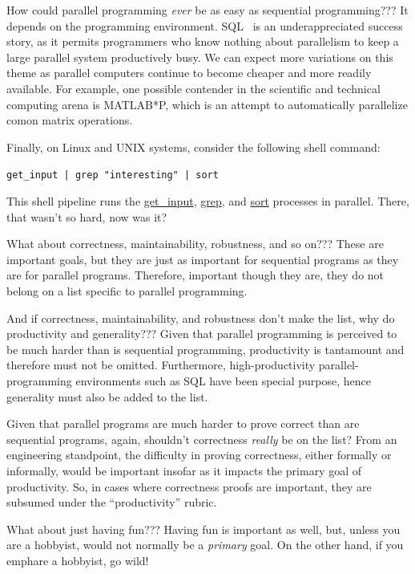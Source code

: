\QuickQ{}
	How could parallel programming \emph{ever} be as easy
	as sequential programming???
\QuickA{}
	It depends on the programming environment.
	SQL~\cite{DIS9075SQL92} is an underappreciated success
	story, as it permits programmers who know nothing about parallelism
	to keep a large parallel system productively busy.
	We can expect more variations on this theme as parallel
	computers continue to become cheaper and more readily available.
	For example, one possible contender in the scientific and
	technical computing arena is MATLAB*P,
	which is an attempt to automatically parallelize comon
	matrix operations.

	Finally, on Linux and UNIX systems, consider the following
	shell command:

	{\tt get\_input | grep "interesting" | sort}

	This shell pipeline runs the \url{get_input}, \url{grep},
	and \url{sort} processes in parallel.
	There, that wasn't so hard, now was it?

\QuickQ{}
	What about correctness, maintainability, robustness, and so on???
\QuickA{}
	These are important goals, but they are just as important for
	sequential programs as they are for parallel programs.
	Therefore, important though they are, they do not belong on
	a list specific to parallel programming.

\QuickQ{}
	And if correctness, maintainability, and robustness don't
	make the list, why do productivity and generality???
\QuickA{}
	Given that parallel programming is perceived to be much harder
	than is sequential programming, productivity is tantamount and
	therefore must not be omitted.
	Furthermore, high-productivity parallel-programming environments
	such as SQL have been special purpose, hence generality must
	also be added to the list.

\QuickQ{}
	Given that parallel programs are much harder to prove
	correct than are sequential programs, again, shouldn't
	correctness \emph{really} be on the list?
\QuickA{}
	From an engineering standpoint, the difficulty in proving
	correctness, either formally or informally, would be important
	insofar as it impacts the primary goal of productivity.
	So, in cases where correctness proofs are important, they
	are subsumed under the ``productivity'' rubric.

\QuickQ{}
	What about just having fun???
\QuickA{}
	Having fun is important as well, but, unless you are a hobbyist,
	would not normally be a \emph{primary} goal.
	On the other hand, if you emph{are} a hobbyist, go wild!

